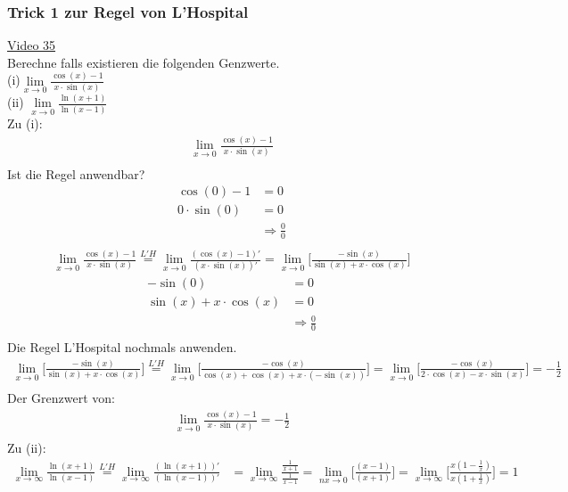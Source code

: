\subsubsection{Trick 1 zur Regel von L’Hospital}
\href{https://youtu.be/Chm62OX6xbE}{Video 35 }\\
Berechne falls existieren die folgenden Genzwerte.\\
(i)\;\;$ \lim\limits_ {x\to 0}\frac{\cos(x)-1}{x\cdot \sin(x)} $\\
(ii) $ \lim\limits_ {x\to 0}\frac{\ln(x+1)}{\ln(x-1)} $\vspace*{2mm}\\
Zu (i):\\
\begin{align*}
\lim\limits_ {x\to 0}\frac{\cos(x)-1}{x\cdot \sin(x)} \\
\end{align*}
Ist die Regel anwendbar?\\
\begin{align*}
\cos(0)-1&=0\\
0\cdot \sin(0)&=0\\
&\Rightarrow \frac{0}{0}\\
\end{align*}
\begin{align*}
\lim\limits_ {x\to 0}\frac{\cos(x)-1}{x\cdot \sin(x)}\overset{L'H}{=}\lim\limits_ {x\to 0}\frac{(\cos(x)-1)'}{(x\cdot \sin(x))'}=\lim\limits_ {x\to 0}\bigg[\frac{-\sin(x)}{\sin(x)+x\cdot \cos(x)}\bigg]
\end{align*}
\begin{align*}
-\sin(0)&=0\\
\sin(x)+x\cdot \cos(x)&=0\\
&\Rightarrow \frac{0}{0}\\
\end{align*}
Die Regel L'Hospital nochmals anwenden.\\
\begin{align*}
\lim\limits_ {x\to 0}\bigg[\frac{-\sin(x)}{\sin(x)+x\cdot \cos(x)}\bigg]\overset{L'H}{=}\lim\limits_ {x\to 0}\bigg[\frac{-\cos(x)}{\cos(x)+\cos(x)+x\cdot (-\sin(x))}\bigg]=\lim\limits_ {x\to 0}\bigg[\frac{-\cos(x)}{2\cdot \cos(x)-x\cdot \sin(x)}\bigg]=-\frac{1}{2}\\
\end{align*}
Der Grenzwert von:\\
\begin{align*}
\lim\limits_ {x\to 0}\frac{\cos(x)-1}{x\cdot \sin(x)}=-\frac{1}{2} \\
\end{align*}
Zu (ii):\\
\begin{align*}
\lim\limits_ {x\to \infty}\frac{\ln(x+1)}{\ln(x-1)}\overset{L'H}{=}\lim\limits_ {x\to \infty}\frac{(\ln(x+1))'}{(\ln(x-1))'}&=\lim\limits_ {x\to \infty}\frac{\frac{1}{x+1}}{\frac{1}{x-1}}=\lim\limits_ {nx\to 0}\bigg[\frac{(x-1)}{(x+1)}\bigg]=\lim\limits_ {x\to \infty}\bigg[\frac{x(1-\frac{1}{x})}{x(1+\frac{1}{x})}\bigg]=1\\
\end{align*}

